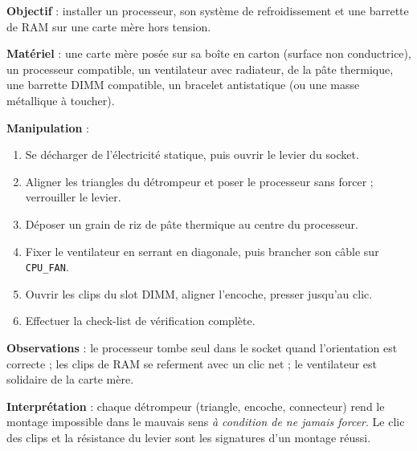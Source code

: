 \documentclass[11pt]{article}
\begin{document}
\begin{experience}
\textbf{Objectif} : installer un processeur, son système de refroidissement et une barrette de RAM sur une carte mère hors tension.\par
\textbf{Matériel} : une carte mère posée sur sa boîte en carton (surface non conductrice), un processeur compatible, un ventilateur avec radiateur, de la pâte thermique, une barrette DIMM compatible, un bracelet antistatique (ou une masse métallique à toucher).\par
\textbf{Manipulation} :
\begin{enumerate}
  \item Se décharger de l'électricité statique, puis ouvrir le levier du socket.
  \item Aligner les triangles du détrompeur et poser le processeur sans forcer ; verrouiller le levier.
  \item Déposer un grain de riz de pâte thermique au centre du processeur.
  \item Fixer le ventilateur en serrant en diagonale, puis brancher son câble sur \texttt{CPU\_FAN}.
  \item Ouvrir les clips du slot DIMM, aligner l'encoche, presser jusqu'au clic.
  \item Effectuer la check-list de vérification complète.
\end{enumerate}
\textbf{Observations} : le processeur tombe seul dans le socket quand l'orientation est correcte ; les clips de RAM se referment avec un clic net ; le ventilateur est solidaire de la carte mère.\par
\textbf{Interprétation} : chaque détrompeur (triangle, encoche, connecteur) rend le montage impossible dans le mauvais sens \emph{à condition de ne jamais forcer}. Le clic des clips et la résistance du levier sont les signatures d'un montage réussi.
\end{experience}
\end{document}
